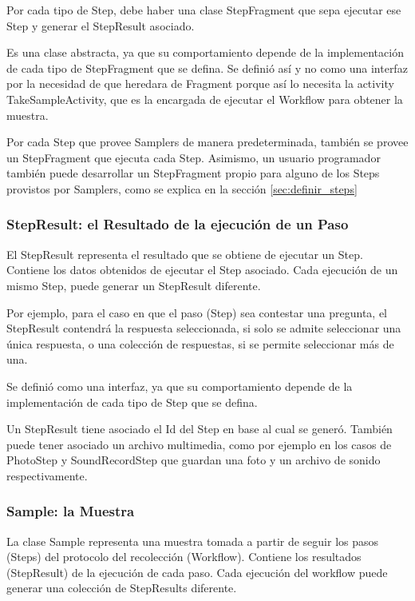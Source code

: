 Por cada tipo de Step, debe haber una clase StepFragment que sepa ejecutar ese Step y generar el StepResult asociado.

Es una clase abstracta, ya que su comportamiento depende de la implementación de cada tipo de StepFragment que se defina. Se definió así y no como una interfaz por la necesidad de que heredara de Fragment porque así lo necesita la activity TakeSampleActivity, que es la encargada de ejecutar el Workflow para obtener la muestra.

Por cada Step que provee Samplers de manera predeterminada, también se provee un StepFragment que ejecuta cada Step. Asimismo, un usuario programador también puede desarrollar un StepFragment propio para alguno de los Steps provistos por Samplers, como se explica en la sección \ref{sec:definir_steps}



\subsubsection{StepResult: el Resultado de la ejecución de un Paso}
El StepResult representa el resultado que se obtiene de ejecutar un Step. Contiene los datos obtenidos de ejecutar el Step asociado. Cada ejecución de un mismo Step, puede generar un StepResult diferente.

Por ejemplo, para el caso en que el paso (Step) sea contestar una pregunta, el StepResult contendrá la respuesta seleccionada, si solo se admite seleccionar una única respuesta, o una colección de respuestas, si se permite seleccionar más de una.

Se definió como una interfaz, ya que su comportamiento depende de la implementación de cada tipo de Step que se defina.

Un StepResult tiene asociado el Id del Step en base al cual se generó. También puede tener asociado un archivo multimedia, como por ejemplo en los casos de PhotoStep y SoundRecordStep que guardan una foto y un archivo de sonido respectivamente.


\subsubsection{Sample: la Muestra}
La clase Sample representa una muestra tomada a partir de seguir los pasos (Steps) del protocolo del recolección (Workflow). Contiene los resultados (StepResult) de la ejecución de cada paso. Cada ejecución del workflow puede generar una colección de StepResults diferente.

